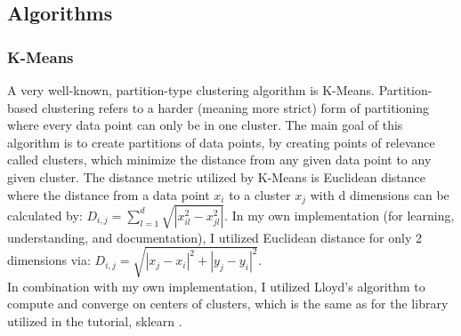 \documentclass[10pt,twocolumn]{article}
\begin{document}
\subsection {Algorithms}

\subsubsection {K-Means}

A very well-known, partition-type clustering algorithm is K-Means. Partition-based clustering refers to a harder (meaning more strict) form of partitioning where every data point can only be in one cluster. The main goal of this algorithm is to create partitions of data points, by creating points of relevance called clusters, which minimize the distance from any given data point to any given cluster. The distance metric utilized by K-Means is Euclidean distance where the distance from a data point \(x_i\) to a cluster \(x_j \) with d dimensions can be calculated by:
\(D_{i, j} = \sum_{l=1}^d \sqrt{|x_{il}^2 - x_{jl}^2|} \). In my own implementation (for learning, understanding, and documentation), I utilized Euclidean distance for only 2 dimensions via: \(D_{i, j} = \sqrt{{|x_{j} - x_{i}|^2} + {|y_{j} - y_{i}|^2}} \). \\ In combination with my own implementation, I utilized Lloyd’s algorithm to compute and converge on centers of clusters, which is the same as for the library utilized in the tutorial, sklearn \cite{skLearnKMeans2020}.


\end{document}
